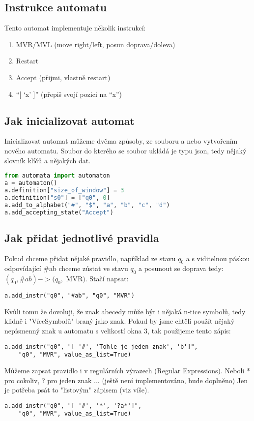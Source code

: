 \documentclass{article}
\begin{document}
\subsection{Instrukce automatu}

Tento automat implementuje několik instrukcí:
\begin{enumerate}
\item  MVR/MVL (move right/left, posun doprava/doleva)
\item  Restart
\item  Accept (přijmi, vlastně restart)
\item  “[ ‘x’ ]” (přepiš svojí pozici na “x”)
\end{enumerate}

\subsection{Jak inicializovat automat}
Inicializovat  automat můžeme dvěma způsoby, ze souboru a nebo vytvořením nového automatu.
Soubor do kterého se soubor ukládá je typu json, tedy nějaký slovník klíčů a nějakých dat.

\begin{lstlisting}[language=Python, caption=Inicializace automatu]
from automata import automaton
a = automaton()
a.definition["size_of_window"] = 3
a.definition["s0"] = ["q0", 0]
a.add_to_alphabet("#", "$", "a", "b", "c", "d")
a.add_accepting_state("Accept")
\end{lstlisting}

\subsection{Jak přidat jednotlivé pravidla}

Pokud chceme přidat nějaké pravidlo,
například ze stavu $q_0$ a s viditelnou páskou odpovídající \#ab chceme zůstat ve stavu $q_0$
a posunout se doprava tedy: $(q_0, \#ab) -> (q_0,$ MVR$)$.
Stačí napsat:
\begin{lstlisting}
a.add_instr("q0", "#ab", "q0", "MVR")
\end{lstlisting}
Kvůli tomu že dovoluji, že znak abecedy může být i nějaká n-tice symbolů, tedy klidně i "VíceSymbolů" braný jako znak.
Pokud by jsme chtěli použít nějaký nepísmenný znak u automatu s velikostí okna 3, tak použijeme tento zápis:
\begin{lstlisting}
a.add_instr("q0", "[ '#', 'Tohle je jeden znak', 'b']",
	"q0", "MVR", value_as_list=True)
\end{lstlisting}
Můžeme zapsat pravidlo i v regulárních výrazech (Regular Expressions).
Neboli * pro cokoliv, ? pro jeden znak ... (ještě není implementováno, bude doplněno)
Jen je potřeba psát to "listovým" zápisem (viz víše).
\begin{lstlisting}
a.add_instr("q0", "[ '#', '*', '?a*']",
	"q0", "MVR", value_as_list=True)
\end{lstlisting}
\end{document}
